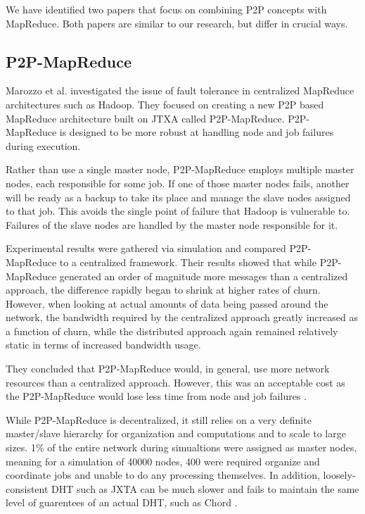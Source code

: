 \documentclass[10pt, conference, compsocconf]{IEEEtran}
\begin{document}
We have identified two papers that focus on combining P2P concepts with MapReduce.  Both papers are similar to our research, but differ in crucial ways.


\subsection{P2P-MapReduce}
Marozzo et al. \cite{marozzo2012p2p} investigated the issue of fault tolerance in centralized MapReduce architectures such as Hadoop.  They focused on creating a new P2P based MapReduce architecture built on JTXA \cite{935182} called P2P-MapReduce.  P2P-MapReduce is designed to be more robust at handling node and job failures during execution.

Rather than use a single master node, P2P-MapReduce employs multiple master nodes, each responsible for some job.  If one of those master nodes fails, another will be ready as a backup to take its place and manage the slave nodes assigned to that job.  This avoids the single point of failure that Hadoop is vulnerable to. Failures of the slave nodes are handled by the master node responsible for it.

Experimental results were gathered via simulation and compared P2P-MapReduce to a centralized framework. Their results showed that while P2P-MapReduce generated an order of magnitude more messages than a centralized approach, the difference rapidly began to shrink at higher rates of churn.  However, when looking at actual amounts of data being passed around the network, the bandwidth required by the centralized approach greatly increased as a function of churn, while the distributed approach again remained relatively static in terms of increased bandwidth usage.  

They concluded that P2P-MapReduce would, in general, use more network resources than a centralized approach. However, this was an acceptable cost as the P2P-MapReduce would lose less time from node and job failures \cite{marozzo2012p2p}.

While P2P-MapReduce is decentralized, it still relies on a very definite master/slave hierarchy for organization and computations and to scale to large sizes.  1\% of the entire network during simualtions were assigned as master nodes, meaning for a simulation of 40000 nodes, 400 were required organize and coordinate jobs and unable to do any processing themselves.  In addition, loosely-consistent DHT such as JXTA can be much slower and fails to maintain the same level of guarentees of an actual DHT, such as Chord \cite{5359174}.   %
\end{document}
